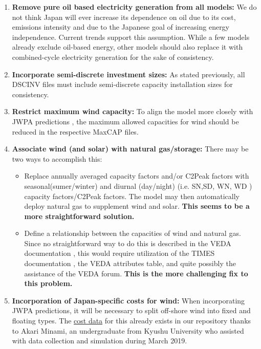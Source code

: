 \documentclass[14pt,a4paper]{article} %
\begin{document}
\begin{enumerate}

\item \textbf{Remove pure oil based electricity generation from all models:} We do not think Japan will ever increase its dependence on oil due to its cost, emissions intensity and due to the Japanese goal of increasing energy independence. Current trends support this assumption. While a few models already exclude oil-based energy, other models should also replace it with combined-cycle electricity generation for the sake of consistency.

\item \textbf{Incorporate semi-discrete investment sizes:} As stated previously, all \gls{DSCINV} files must include semi-discrete capacity installation sizes for consistency.

\item \textbf{Restrict maximum wind capacity:} To align the model more closely with JWPA predictions \cite{heger_wind_2016}, the maximum allowed capacities for wind should be reduced in the respective \gls{MaxCAP} files.

\item \textbf{Associate wind (and solar) with natural gas/storage:} There may be two ways to accomplish this:

\begin{itemize}

\item Replace annually averaged capacity factors and/or \gls{C2Peak} factors with seasonal(sumer/winter) and diurnal (day/night) (i.e. SN,SD, WN, WD \cite{gargiulo_documentation_2005} ) capacity factors/\gls{C2Peak} factors. The model may then automatically deploy natural gas to supplement wind and solar. \textbf{This seems to be a more straightforward solution.}

\item Define a relationship between the capacities of wind and natural gas. Since no straightforward way to do this is described in the VEDA documentation \cite{gargiulo_documentation_2005}, this would require utilization of the \gls{TIMES} documentation \cite{loulou_documentation_2005}, the VEDA attributes table, and quite possibly the assistance of the VEDA forum. \textbf{This is the more challenging fix to this problem.}

\end{itemize}

\item \textbf{Incorporation of Japan-specific costs for wind:} When incorporating \gls{JWPA} predictions, it will be necessary to split off-shore wind into fixed and floating types. The \href{https://github.com/arfc/i2cner/tree/master/data/japan_costs}{cost data} for this already exists in our repository thanks to Akari Minami, an undergraduate from Kyushu University who assisted with data collection and simulation during March 2019.


\end{enumerate}
\end{document}
